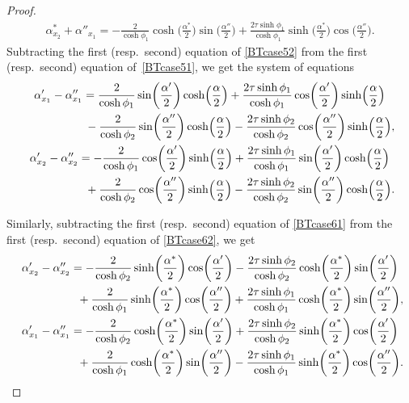 \documentclass[10pt,a4paper]{amsart}
\numberwithin{equation}{section}
\begin{document}
\begin{proof}
\begin{gather}
\alpha^*_{x_2}+\alpha''_{x_1}=-\frac{2}{\cosh\phi_1}\cosh\biggl(\frac{\alpha^*}{2}\biggr)\sin\biggl(\frac{\alpha''}{2}\biggr)+\frac{2\tau\sinh\phi_1}{\cosh\phi_1} \sinh\biggl(\frac{\alpha^*}{2}\biggr)\cos\biggl(\frac{\alpha''}{2}\biggr).\label{BTcase61}
\end{gather}
Subtracting the first (resp.\ second) equation of \eqref{BTcase52} from the first (resp.\ second) equation of~\eqref{BTcase51}, we get the system of equations
\begin{gather}
\alpha'_{x_1}-\alpha''_{x_1}=\frac{2}{\cosh\phi_1}\sin\biggl(\frac{\alpha'}{2}\biggr)\cosh \Bigl(\frac{\alpha}{2}\Bigr)+\frac{2\tau\sinh\phi_1}{\cosh\phi_1} \cos\biggl(\frac{\alpha'}{2}\biggr)\sinh\Bigl(\frac{\alpha}{2}\Bigr)
\nonumber\\ \hphantom{\alpha'_{x_1}-\alpha''_{x_1}=}{}
- \frac{2}{\cosh\phi_2}\sin\biggl(\frac{\alpha''}{2}\biggr)\cosh \Bigl(\frac{\alpha}{2}\Bigr)-\frac{2\tau\sinh\phi_2}{\cosh\phi_2} \cos\biggl(\frac{\alpha''}{2}\biggr)\sinh\Bigl(\frac{\alpha}{2}\Bigr),\nonumber\\
\alpha'_{x_2}-\alpha''_{x_2}= -\frac{2}{\cosh\phi_1}\cos\biggl(\frac{\alpha'}{2}\biggr)\sinh\Bigl(\frac{\alpha}{2}\Bigr)+\frac{2\tau\sinh\phi_1}{\cosh\phi_1} \sin\biggl(\frac{\alpha'}{2}\biggr)\cosh\Bigl(\frac{\alpha}{2}\Bigr)
\nonumber\\ \hphantom{\alpha'_{x_2}-\alpha''_{x_2}=}{}
+\frac{2}{\cosh\phi_2}\cos\biggl(\frac{\alpha''}{2}\biggr)\sinh\Bigl(\frac{\alpha}{2}\Bigr)-\frac{2\tau\sinh\phi_2}{\cosh\phi_2} \sin\biggl(\frac{\alpha''}{2}\biggr)\cosh\Bigl(\frac{\alpha}{2}\Bigr). \label{BT51minusBT52}
\end{gather}

Similarly, subtracting the first (resp.\ second) equation of \eqref{BTcase61} from the first (resp.\ second) equation of \eqref{BTcase62}, we get
\begin{gather}
\alpha'_{x_2}-\alpha''_{x_2}=-\frac{2}{\cosh\phi_2}\sinh\biggl(\frac{\alpha^*}{2}\biggr)\cos\biggl(\frac{\alpha'}{2}\biggr)-\frac{2\tau\sinh\phi_2}{\cosh\phi_2} \cosh\biggl(\frac{\alpha^*}{2}\biggr)\sin\biggl(\frac{\alpha'}{2}\biggr)
\nonumber\\ \hphantom{\alpha'_{x_2}-\alpha''_{x_2}=}{}
 +\frac{2}{\cosh\phi_1}\sinh\biggl(\frac{\alpha^*}{2}\biggr)\cos\biggl(\frac{\alpha''}{2}\biggr)+\frac{2\tau\sinh\phi_1}{\cosh\phi_1} \cosh\biggl(\frac{\alpha^*}{2}\biggr)\sin\biggl(\frac{\alpha''}{2}\biggr),\nonumber\\
\alpha'_{x_1}-\alpha''_{x_1}=-\frac{2}{\cosh\phi_ 2}\cosh\biggl(\frac{\alpha^*}{2}\biggr)\sin\biggl(\frac{\alpha'}{2}\biggr)+\frac{2\tau\sinh\phi_2}{\cosh\phi_2} \sinh\biggl(\frac{\alpha^*}{2}\biggr)\cos\biggl(\frac{\alpha'}{2}\biggr)
\nonumber\\ \hphantom{\alpha'_{x_1}-\alpha''_{x_1}=}{}
 +\frac{2}{\cosh\phi_1}\cosh\biggl(\frac{\alpha^*}{2}\biggr)\sin\biggl(\frac{\alpha''}{2}\biggr)- \frac{2\tau\sinh\phi_1}{\cosh\phi_1} \sinh\biggl(\frac{\alpha^*}{2}\biggr)\cos\biggl(\frac{\alpha''}{2}\biggr). \label{BT62minusBT61}
\end{gather}


\end{proof}
\end{document}

